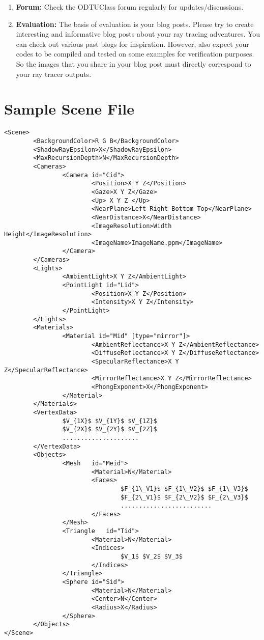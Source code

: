 \documentclass[12pt]{article}
\begin{document}
\begin{enumerate}
\item \textbf{Forum:} Check the ODTUClass forum regularly for
updates/discussions.

\item \textbf{Evaluation:} The basis of evaluation is your blog posts.
Please try to create interesting and informative blog posts about your
ray tracing adventures. You can check out various past blogs for
inspiration. However, also expect your codes to be compiled and tested
on some examples for verification purposes. So the images that you share
in your blog post must directly correspond to your ray tracer outputs.

\end{enumerate}


\newpage

\section{Sample Scene File}
\label{sec:sampleSceneFile}

\lstset{language=XML}

\begin{lstlisting}[mathescape]
<Scene>
		<BackgroundColor>R G B</BackgroundColor>
		<ShadowRayEpsilon>X</ShadowRayEpsilon>
		<MaxRecursionDepth>N</MaxRecursionDepth>
		<Cameras>
				<Camera id="Cid">
						<Position>X Y Z</Position>
						<Gaze>X	Y Z</Gaze>
						<Up> X Y Z </Up>
						<NearPlane>Left	Right Bottom Top</NearPlane>
						<NearDistance>X</NearDistance>
						<ImageResolution>Width Height</ImageResolution>
						<ImageName>ImageName.ppm</ImageName>
				</Camera>
		</Cameras>
		<Lights>
				<AmbientLight>X	Y Z</AmbientLight>
				<PointLight	id="Lid">
						<Position>X Y Z</Position>
						<Intensity>X Y Z</Intensity>
				</PointLight>
		</Lights>
		<Materials>
				<Material id="Mid" [type="mirror"]>
						<AmbientReflectance>X Y Z</AmbientReflectance>
						<DiffuseReflectance>X Y Z</DiffuseReflectance>
						<SpecularReflectance>X Y Z</SpecularReflectance>
						<MirrorReflectance>X Y Z</MirrorReflectance>
						<PhongExponent>X</PhongExponent>
				</Material>
		</Materials>
		<VertexData>
				$V_{1X}$ $V_{1Y}$ $V_{1Z}$
				$V_{2X}$ $V_{2Y}$ $V_{2Z}$
				.....................
		</VertexData>
		<Objects>
				<Mesh	id="Meid">
						<Material>N</Material>
						<Faces>
								$F_{1\_V1}$ $F_{1\_V2}$ $F_{1\_V3}$
								$F_{2\_V1}$ $F_{2\_V2}$ $F_{2\_V3}$
								.........................
						</Faces>
				</Mesh>
				<Triangle	id="Tid">
						<Material>N</Material>
						<Indices>
								$V_1$ $V_2$ $V_3$
						</Indices>
				</Triangle>
				<Sphere	id="Sid">
						<Material>N</Material>
						<Center>N</Center>
						<Radius>X</Radius>
				</Sphere>
		</Objects>	
</Scene>
\end{lstlisting}

\normalsize
\end{document}
